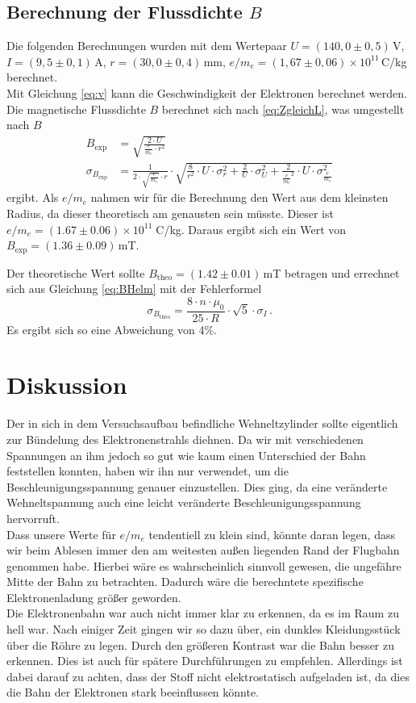 \documentclass[12pt,a4paper,titlepage,headinclude,bibtotoc]{scrartcl}
\numberwithin{equation}{section}
\begin{document}
\subsection{Berechnung der Flussdichte $B$}
Die folgenden Berechnungen wurden mit dem Wertepaar $U=(140,0 \pm 0,5)\,$V, $I=(9,5 \pm 0,1)\,$A, $r=(30,0 \pm 0,4)\,$mm, $e/m_e=(1,67 \pm 0,06)\times10^{11}\,$C/kg berechnet.\\
Mit Gleichung \eqref{eq:v} kann die Geschwindigkeit der Elektronen berechnet werden.
Die magnetische Flussdichte $B$ berechnet sich nach \eqref{eq:ZgleichL}, was umgestellt nach $B$
\begin{align*}
B_\text{exp}&=\sqrt{\frac{2\cdot U}{\frac{e}{m_e} \cdot r^{2}}}\label{eq:B}\\
\sigma_{B_\text{exp}}&=\frac{1}{2 \cdot \sqrt{\frac{e}{m_e}} \cdot r} \cdot \sqrt{\frac{8}{r^{2}} \cdot U \cdot \sigma_{r}^{2} + \frac{2}{U} \cdot \sigma_{U}^{2} + \frac{2}{\frac{e}{m_e}^{2}} \cdot U \cdot \sigma_{\frac{e}{m_e}}^{2}}
\end{align*}
ergibt.
Als $e/m_e$ nahmen wir für die Berechnung den Wert aus dem kleinsten Radius, da dieser theoretisch am genausten sein müsste.
Dieser ist $e/m_e=(1.67\pm0.06)\times 10^{11}\;$C/kg.
Daraus ergibt sich ein Wert von $B_\text{exp}=(1.36 \pm 0.09)\,$mT.

Der theoretische Wert sollte $B_\text{theo}=(1.42 \pm 0.01)\,$mT betragen und errechnet sich aus Gleichung \eqref{eq:BHelm} mit der Fehlerformel
$$\sigma_{B_\text{theo}}=\frac{8 \cdot n \cdot \mu_{0}}{25 \cdot R} \cdot \sqrt{5} \cdot \sigma_{I}\, .$$
Es ergibt sich so eine Abweichung von 4\%.


\newpage
\section{Diskussion}
\label{sec:diskussion}
Der in sich in dem Versuchsaufbau befindliche Wehneltzylinder sollte eigentlich zur Bündelung des Elektronenstrahls diehnen.
Da wir mit verschiedenen Spannungen an ihm jedoch so gut wie kaum einen Unterschied der Bahn feststellen konnten, haben wir ihn nur verwendet, um die Beschleunigungsspannung genauer einzustellen.
Dies ging, da eine veränderte Wehneltspannung auch eine leicht veränderte Beschleunigungsspannung hervorruft.\\
Dass unsere Werte für $e/m_e$ tendentiell zu klein sind, könnte daran legen, dass wir beim Ablesen immer den am weitesten außen liegenden Rand der Flugbahn genommen habe.
Hierbei wäre es wahrscheinlich sinnvoll gewesen, die ungefähre Mitte der Bahn zu betrachten.
Dadurch wäre die berechntete spezifische Elektronenladung größer geworden.\\
Die Elektronenbahn war auch nicht immer klar zu erkennen, da es im Raum zu hell war.
Nach einiger Zeit gingen wir so dazu über, ein dunkles Kleidungsstück über die Röhre zu legen.
Durch den größeren Kontrast war die Bahn besser zu erkennen.
Dies ist auch für spätere Durchführungen zu empfehlen.
Allerdings ist dabei darauf zu achten, dass der Stoff nicht elektrostatisch aufgeladen ist, da dies die Bahn der Elektronen stark beeinflussen könnte.




\end{document}
